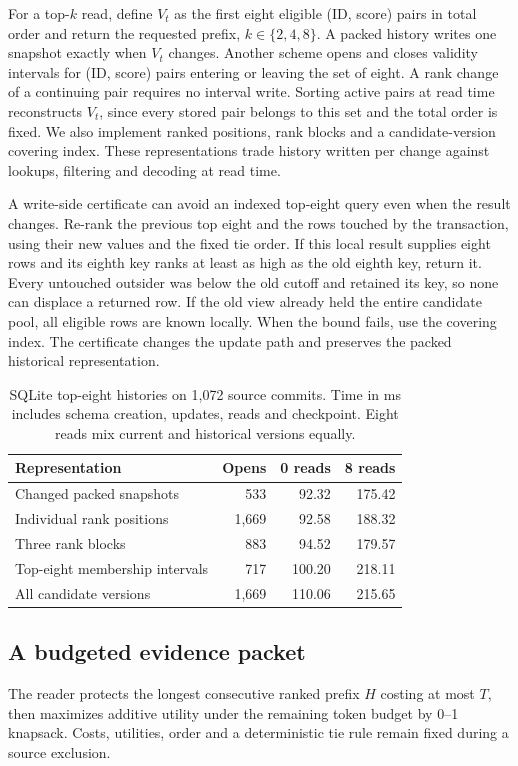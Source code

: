 \documentclass[conference]{IEEEtran}
\begin{document}
For a top-$k$ read, define $V_t$ as the first eight eligible (ID, score) pairs in total order and return the requested prefix, $k\in\{2,4,8\}$. A packed history writes one snapshot exactly when $V_t$ changes. Another scheme opens and closes validity intervals for (ID, score) pairs entering or leaving the set of eight. A rank change of a continuing pair requires no interval write. Sorting active pairs at read time reconstructs $V_t$, since every stored pair belongs to this set and the total order is fixed. We also implement ranked positions, rank blocks and a candidate-version covering index. These representations trade history written per change against lookups, filtering and decoding at read time.

A write-side certificate can avoid an indexed top-eight query even when the result changes. Re-rank the previous top eight and the rows touched by the transaction, using their new values and the fixed tie order. If this local result supplies eight rows and its eighth key ranks at least as high as the old eighth key, return it. Every untouched outsider was below the old cutoff and retained its key, so none can displace a returned row. If the old view already held the entire candidate pool, all eligible rows are known locally. When the bound fails, use the covering index. The certificate changes the update path and preserves the packed historical representation.

\begin{table}[t]
\caption{SQLite top-eight histories on 1,072 source commits. Time in ms includes schema creation, updates, reads and checkpoint. Eight reads mix current and historical versions equally.}
\centering\small
\begin{tabular}{@{}lrrr@{}}\toprule
Representation & Opens & 0 reads & 8 reads\\\midrule
Changed packed snapshots & 533 & 92.32 & 175.42\\
Individual rank positions & 1,669 & 92.58 & 188.32\\
Three rank blocks & 883 & 94.52 & 179.57\\
Top-eight membership intervals & 717 & 100.20 & 218.11\\
All candidate versions & 1,669 & 110.06 & 215.65\\\bottomrule
\end{tabular}
\label{tab:top}
\end{table}

\subsection{A budgeted evidence packet}
The reader protects the longest consecutive ranked prefix $H$ costing at most $T$, then maximizes additive utility under the remaining token budget by 0--1 knapsack. Costs, utilities, order and a deterministic tie rule remain fixed during a source exclusion.
\end{document}
